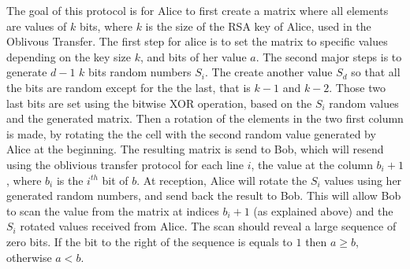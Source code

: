 \documentclass[11pt,a4paper]{article}
\begin{document}
The goal of this protocol is for Alice to first create
a matrix where all elements are values of $k$ bits, where
$k$ is the size of the RSA key of Alice, used in the Oblivous Transfer.
The first step for alice is to set the matrix to specific values
depending on the key size $k$, and bits of her value $a$.
The second major steps is to generate $d - 1$ $k$ bits random
numbers $S_i$. The create another value $S_d$ so that all the
bits are random except for the the last, that is $k-1$ and $k-2$.
Those two last bits are set using the bitwise XOR operation,
based on the $S_i$ random values and the generated matrix.
Then a rotation of the elements in the two first column
is made, by rotating the the cell with the second random
value generated by Alice at the beginning. The resulting
matrix is send to Bob, which will resend using
the oblivious transfer protocol for each line $i$, the value
at the column $b_i + 1$, where $b_i$ is the $i^{th}$ bit of $b$.
At reception, Alice will rotate the $S_i$ values using
her generated random numbers, and send back the result to Bob.
This will allow Bob to scan the value from the matrix at indices $b_i + 1$
(as explained above) and the $S_i$ rotated values received from Alice.
The scan should reveal a large sequence of zero bits. If
the bit to the right of the sequence is equals to $1$ then
$a \ge b$, otherwise $a < b$.





\end{document}
